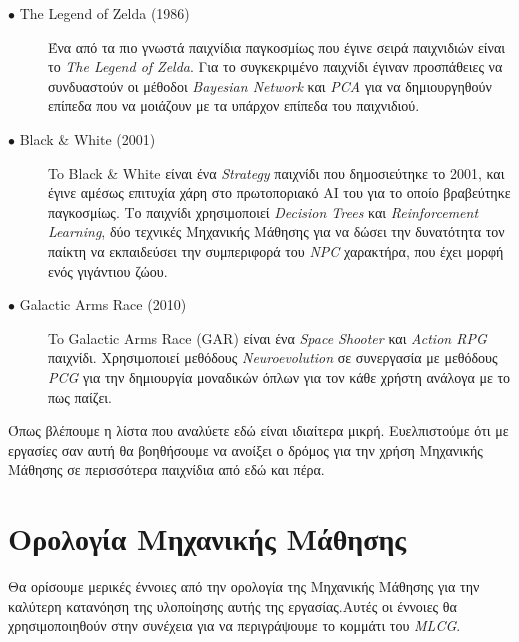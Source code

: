 \begin{description}

\item[$\bullet$ The Legend of Zelda (1986)] Ένα από τα πιο γνωστά παιχνίδια παγκοσμίως που έγινε σειρά παιχνιδιών είναι το \textit{The Legend of Zelda}. Για το συγκεκριμένο παιχνίδι έγιναν προσπάθειες να συνδυαστούν οι μέθοδοι \textit{Bayesian Network} και \textit{PCA} για να δημιουργηθούν επίπεδα που να μοιάζουν με τα υπάρχον επίπεδα του παιχνιδιού.

\item[$\bullet$ Black \& White (2001)] To Black \& White είναι ένα \textit{Strategy} παιχνίδι που δημοσιεύτηκε το 2001, και έγινε αμέσως επιτυχία χάρη στο πρωτοποριακό AI του για το οποίο βραβεύτηκε παγκοσμίως. Το παιχνίδι χρησιμοποιεί \textit{Decision Trees} και \textit{Reinforcement Learning}, δύο τεχνικές Μηχανικής Μάθησης για να δώσει την δυνατότητα τον παίκτη να εκπαιδεύσει την συμπεριφορά του \textit{NPC} χαρακτήρα, που έχει μορφή ενός γιγάντιου ζώου. 

\item[$\bullet$ Galactic Arms Race (2010)] To Galactic Arms Race (GAR) είναι ένα \textit{Space Shooter} και \textit{Action RPG} παιχνίδι. Χρησιμοποιεί μεθόδους \textit{Neuroevolution} σε συνεργασία με μεθόδους \textit{PCG} για την δημιουργία μοναδικών όπλων για τον κάθε χρήστη ανάλογα με το πως παίζει. 

\end{description}

\par
Όπως βλέπουμε η λίστα που αναλύετε εδώ είναι ιδιαίτερα μικρή. Ευελπιστούμε ότι με εργασίες σαν αυτή θα βοηθήσουμε να ανοίξει ο δρόμος για την χρήση Μηχανικής Μάθησης σε περισσότερα παιχνίδια από εδώ και πέρα.


\section{Ορολογία Μηχανικής Μάθησης}
Θα ορίσουμε μερικές έννοιες από την ορολογία της Μηχανικής Μάθησης για την καλύτερη κατανόηση της υλοποίησης αυτής της εργασίας.Αυτές οι έννοιες θα χρησιμοποιηθούν στην συνέχεια για να περιγράψουμε το κομμάτι του \textit{MLCG}.

